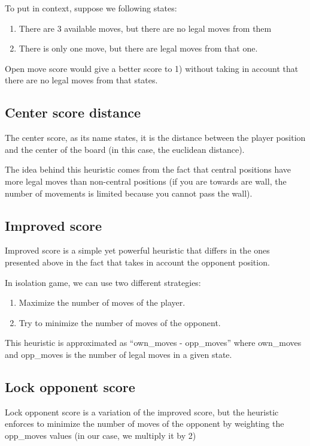\documentclass[10pt,a4paper]{article}
\begin{document}
To put in context, suppose we following states:
\begin{enumerate}
\item There are 3 available moves, but there are no legal moves from them
\item There is only one move, but there are legal moves from that one.
\end{enumerate}

Open move score would give a better score to 1) without taking in account that there are no legal moves from that states.

\subsection{Center score distance}
The center score, as its name states, it is the distance between the player position and the center of the board (in this case, the euclidean distance).\newline

The idea behind this heuristic comes from the fact that central positions have more legal moves than non-central positions (if you are towards are wall, the number of movements is limited because you cannot pass the wall).
 

\subsection{Improved score}
Improved score is a simple yet powerful heuristic that differs in the ones presented above in the fact that takes in account the opponent position.\newline

In isolation game, we can use two different strategies:
\begin{enumerate}
\item Maximize the number of moves of the player. 
\item Try to minimize the number of moves of the opponent.
\end{enumerate}

This heuristic is approximated as ``own\_moves - opp\_moves'' where own\_moves and opp\_moves is the number of legal moves in a given state.

\subsection{Lock opponent score}
Lock opponent score is a variation of the improved score, but the heuristic enforces to minimize the number of moves of the opponent by weighting the opp\_moves values (in our case, we multiply it by 2)
\end{document}
